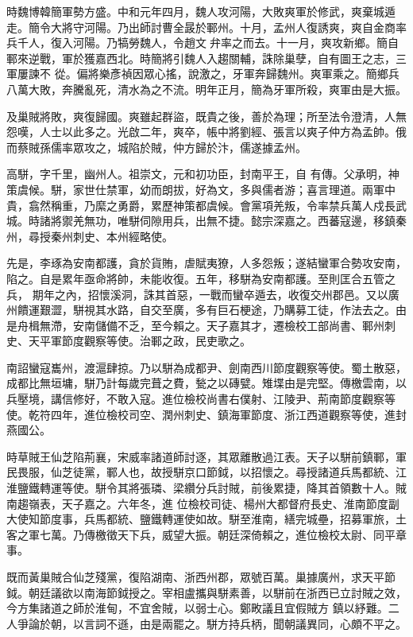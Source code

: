 \begin{pinyinscope}
 時魏博韓簡軍勢方盛。中和元年四月，魏人攻河陽，大敗爽軍於修武，爽棄城遁走。簡令大將守河陽。乃出師討曹全晸於鄆州。十月，孟州人復誘爽，爽自金商率兵千人，復入河陽。乃犒勞魏人，令趙文弁率之而去。十一月，爽攻新鄉。簡自鄆來逆戰，軍於獲嘉西北。時簡將引魏人入趨關輔，誅除巢孽，自有圖王之志，三軍屢諫不
 從。偏將樂彥禎因眾心搖，說激之，牙軍奔歸魏州。爽軍乘之。簡鄉兵八萬大敗，奔騰亂死，清水為之不流。明年正月，簡為牙軍所殺，爽軍由是大振。



 及巢賊將敗，爽復歸國。爽雖起群盜，既貴之後，善於為理；所至法令澄清，人無怨嘆，人士以此多之。光啟二年，爽卒，帳中將劉經、張言以爽子仲方為孟帥。俄而蔡賊孫儒率眾攻之，城陷於賊，仲方歸於汴，儒遂據孟州。



 高駢，字千里，幽州人。祖崇文，元和初功臣，封南平王，自
 有傳。父承明，神策虞候。駢，家世仕禁軍，幼而朗拔，好為文，多與儒者游；喜言理道。兩軍中貴，翕然稱重，乃縻之勇爵，累歷神策都虞候。會黨項羌叛，令率禁兵萬人戍長武城。時諸將禦羌無功，唯駢伺隙用兵，出無不捷。懿宗深嘉之。西蕃寇邊，移鎮秦州，尋授秦州刺史、本州經略使。



 先是，李琢為安南都護，貪於貨賄，虐賦夷獠，人多怨叛；遂結蠻軍合勢攻安南，陷之。自是累年亟命將帥，未能收復。五年，移駢為安南都護。至則匡合五管之兵，
 期年之內，招懷溪洞，誅其首惡，一戰而蠻卒遁去，收復交州郡邑。又以廣州饋運艱澀，駢視其水路，自交至廣，多有巨石梗途，乃購募工徒，作法去之。由是舟楫無滯，安南儲備不乏，至今賴之。天子嘉其才，遷檢校工部尚書、鄆州刺史、天平軍節度觀察等使。治鄆之政，民吏歌之。



 南詔蠻寇巂州，渡滬肆掠。乃以駢為成都尹、劍南西川節度觀察等使。蜀土散惡，成都比無垣墉，駢乃計每歲完葺之費，甃之以磚甓。雉堞由是完堅。傳檄雲南，以
 兵壓境，講信修好，不敢入寇。進位檢校尚書右僕射、江陵尹、荊南節度觀察等使。乾符四年，進位檢校司空、潤州刺史、鎮海軍節度、浙江西道觀察等使，進封燕國公。



 時草賊王仙芝陷荊襄，宋威率諸道師討逐，其眾離散過江表。天子以駢前鎮鄆，軍民畏服，仙芝徒黨，鄆人也，故授駢京口節鉞，以招懷之。尋授諸道兵馬都統、江淮鹽鐵轉運等使。駢令其將張璘、梁纘分兵討賊，前後累捷，降其首領數十人。賊南趨嶺表，天子嘉之。六年冬，進
 位檢校司徒、楊州大都督府長史、淮南節度副大使知節度事，兵馬都統、鹽鐵轉運使如故。駢至淮南，繕完城壘，招募軍旅，土客之軍七萬。乃傳檄徵天下兵，威望大振。朝廷深倚賴之，進位檢校太尉、同平章事。



 既而黃巢賊合仙芝殘黨，復陷湖南、浙西州郡，眾號百萬。巢據廣州，求天平節鉞。朝廷議欲以南海節鉞授之。宰相盧攜與駢素善，以駢前在浙西已立討賊之效，今方集諸道之師於淮甸，不宜舍賊，以弱士心。鄭畋議且宜假賊方
 鎮以紓難。二人爭論於朝，以言詞不遜，由是兩罷之。駢方持兵柄，聞朝議異同，心頗不平之。




\end{pinyinscope}
